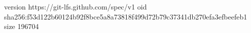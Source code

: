 version https://git-lfs.github.com/spec/v1
oid sha256:f53d122b60124b92f8bce5a8a73818f499d72b79c37341db270efa3efbeefeb1
size 196704
